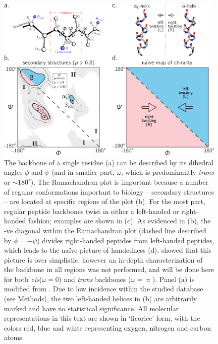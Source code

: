 \documentclass[fleqn,10pt,lineno]{wlpeerj} %
\newcommand{\n}[1]{{\color{black}#1}} %
\newcommand{\cis}{{\em{cis}}\xspace}
\newcommand{\trans}{{\em{trans}}\xspace}
\begin{document}
\begin{figure}[t!]
\centering
\includegraphics[width=0.8\linewidth]{./figures/chirality_intro.pdf}
\caption{\label{fig:intro} 
The backbone of a single residue (a) can be described by its dihedral angles $\phi$ and $\psi$ (and in smaller part, $\omega$, which is predominantly \trans or $\sim 180^\circ$). \n{The Ramachandran plot is important because a number of regular conformations important to biology -- secondary structures -- are located at specific regions of the plot (b). For the most part, regular peptide backbones twist in either a left-handed or right-handed fashion}; examples are shown in (c). 
As evidenced in (b), the -ve diagonal within the Ramachandran plot (dashed line described by \n{$\phi=-\psi$}) divides right-handed peptides from left-handed peptides, which leads to the na{\"i}ve picture of handedness (d). \cite{Zacharias2013} showed that this picture is over simplistic, however an in-depth characterization of the backbone in all regions was not performed, and will be done here for both \cis ($\omega=0$) and \trans backbones ($\omega=\uppi$). Panel (a) is modified from \cite{Mannige2016}. Due to low \n{incidence} within the studied database (see Methods), the two left-handed helices in (b) are arbitrarily marked and have no statistical significance. \n{A}ll molecular representations in this text are shown in `licorice' form, with the colors red, blue and white representing oxygen, nitrogen and carbon atoms. 
}
\end{figure}
\end{document}
